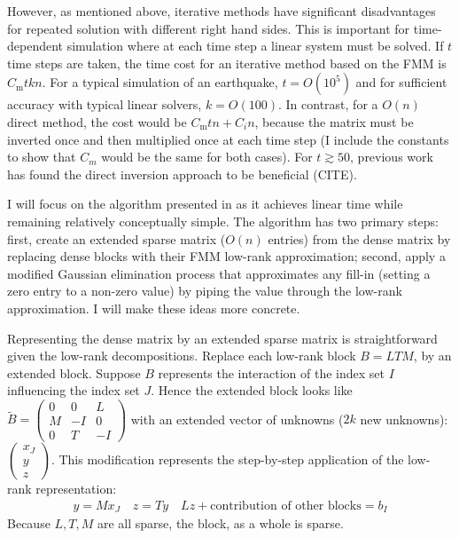 \documentclass[a4paper]{article}
\begin{document}
However, as mentioned above, iterative methods have significant disadvantages for repeated solution with different right hand sides. This is important for time-dependent simulation where at each time step a linear system must be solved. If $t$ time steps are taken, the time cost for an iterative method based on the FMM is $C_{\textrm{m}}tkn$. For a typical simulation of an earthquake, $t = O(10^5)$ and for sufficient accuracy with typical linear solvers, $k = O(100)$. In contrast, for a $O(n)$ direct method, the cost would be $C_{\textrm{m}}tn + C_{i}n$, because the matrix must be inverted once and then multiplied once at each time step (I include the constants to show that $C_m$ would be the same for both cases). For $t \gtrsim 50$, previous work has found the direct inversion approach to be beneficial (CITE).

I will focus on the algorithm presented in \citep{Ambikasaran2014} as it achieves linear time while remaining relatively conceptually simple. The algorithm has two primary steps: first, create an extended sparse matrix ($O(n)$ entries) from the dense matrix by replacing dense blocks with their FMM low-rank approximation; second, apply a modified Gaussian elimination process that approximates any fill-in (setting a zero entry to a non-zero value) by piping the value through the low-rank approximation. I will make these ideas more concrete.

Representing the dense matrix by an extended sparse matrix is straightforward given the low-rank decompositions. Replace each low-rank block $B = LTM$, by an extended block. Suppose $B$ represents the interaction of the index set $I$ influencing the index set $J$. Hence the extended block looks like $\widetilde{B} = \left( \begin{array}{ccc} 0 & 0 & L \\ M & -I & 0 \\ 0 & T & -I \end{array} \right)$ with an extended vector of unknowns ($2k$ new unknowns): $\left( \begin{array}{ccc} x_J \\ y \\ z \end{array} \right)$. This modification represents the step-by-step application of the low-rank representation:
\begin{align}
    y = Mx_J \quad z = Ty \quad Lz + \textrm{contribution of other blocks} = b_{I}
\end{align}
Because $L, T, M$ are all sparse, the block, as a whole is sparse.
\end{document}
